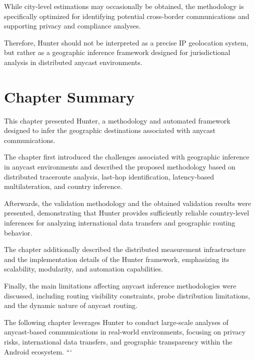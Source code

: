 While city-level estimations may occasionally be obtained, the methodology is specifically optimized for identifying potential cross-border communications and supporting privacy and compliance analyses.

Therefore, Hunter should not be interpreted as a precise IP geolocation system, but rather as a geographic inference framework designed for jurisdictional analysis in distributed anycast environments.

\section{Chapter Summary}
\label{sc:hunter_summary}

This chapter presented Hunter, a methodology and automated framework designed to infer the geographic destinations associated with anycast communications.

The chapter first introduced the challenges associated with geographic inference in anycast environments and described the proposed methodology based on distributed traceroute analysis, last-hop identification, latency-based multilateration, and country inference.

Afterwards, the validation methodology and the obtained validation results were presented, demonstrating that Hunter provides sufficiently reliable country-level inferences for analyzing international data transfers and geographic routing behavior.

The chapter additionally described the distributed measurement infrastructure and the implementation details of the Hunter framework, emphasizing its scalability, modularity, and automation capabilities.

Finally, the main limitations affecting anycast inference methodologies were discussed, including routing visibility constraints, probe distribution limitations, and the dynamic nature of anycast routing.

The following chapter leverages Hunter to conduct large-scale analyses of anycast-based communications in real-world environments, focusing on privacy risks, international data transfers, and geographic transparency within the Android ecosystem.
```
